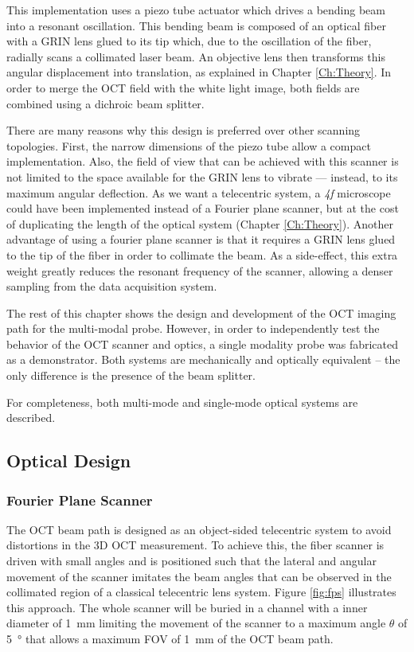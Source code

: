 This implementation uses a piezo tube actuator which drives a bending beam into a resonant oscillation. This bending beam is composed of an optical fiber with a GRIN lens glued to its tip which, due to the oscillation of the fiber, radially scans a collimated laser beam. An objective lens then transforms this angular displacement into translation, as explained in Chapter \ref{Ch:Theory}. In order to merge the OCT field with the white light image, both fields are combined using a dichroic beam splitter.

There are many reasons why this design is preferred over other scanning topologies. First, the narrow dimensions of the piezo tube allow a compact implementation. Also, the field of view that can be achieved with this scanner is not limited to the space available for the GRIN lens to vibrate --- instead, to its maximum angular deflection. As we want a telecentric system, a \textit{4f} microscope could have been implemented instead of a Fourier plane scanner, but at the cost of duplicating the length of the optical system (Chapter \ref{Ch:Theory}). Another advantage of using a fourier plane scanner is that it requires a GRIN lens glued to the tip of the fiber in order to collimate the beam. As a side-effect, this extra weight greatly reduces the resonant frequency of the scanner, allowing a denser sampling from the data acquisition system. 

The rest of this chapter shows the design and development of the OCT imaging path for the multi-modal probe. However, in order to independently test the behavior of the OCT scanner and optics, a single modality probe was fabricated as a demonstrator. Both systems are mechanically and optically equivalent -- the only difference is the presence of the beam splitter. 

For completeness, both multi-mode and single-mode optical systems are described.


\newpage
\subsection{Optical Design}

\subsubsection*{Fourier Plane Scanner}
The OCT beam path is designed as an object-sided telecentric system to avoid distortions in the 3D OCT measurement. To achieve this, the fiber scanner is driven with small angles and is positioned such that the lateral and angular movement of the scanner imitates the beam angles that can be observed in the collimated region of a classical telecentric lens system. Figure \ref{fig:fps} illustrates this approach. The whole scanner will be buried in a channel with a inner diameter of \SI{1}{\milli\meter} limiting the movement of the scanner to a maximum angle $\theta$ of \SI{5}{\degree} that allows a maximum FOV of \SI{1}{\milli\meter} of the OCT beam path.



